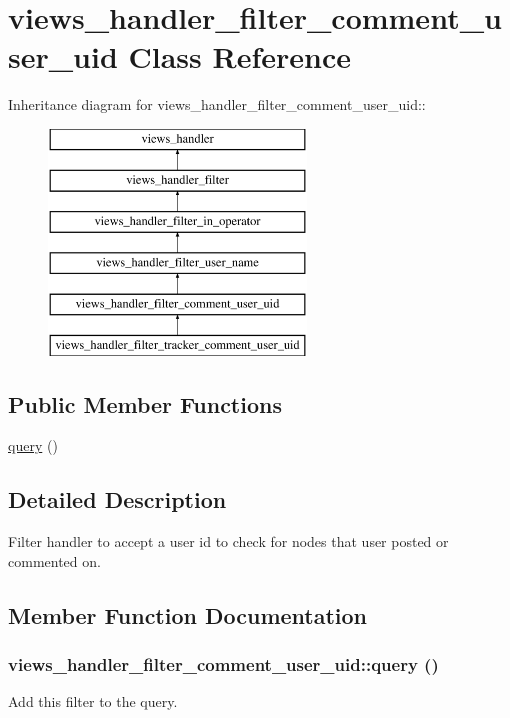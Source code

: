 \hypertarget{classviews__handler__filter__comment__user__uid}{
\section{views\_\-handler\_\-filter\_\-comment\_\-user\_\-uid Class Reference}
\label{classviews__handler__filter__comment__user__uid}
}
Inheritance diagram for views\_\-handler\_\-filter\_\-comment\_\-user\_\-uid::\begin{figure}[H]
\begin{center}
\leavevmode
\includegraphics[height=6cm]{classviews__handler__filter__comment__user__uid}
\end{center}
\end{figure}
\subsection*{Public Member Functions}
\begin{DoxyCompactItemize}
\item 
\hyperlink{classviews__handler__filter__comment__user__uid_a5b649bd04038ac8ed577410ad54ad5b0}{query} ()
\end{DoxyCompactItemize}


\subsection{Detailed Description}
Filter handler to accept a user id to check for nodes that user posted or commented on. 

\subsection{Member Function Documentation}
\hypertarget{classviews__handler__filter__comment__user__uid_a5b649bd04038ac8ed577410ad54ad5b0}{
\subsubsection[{query}]{\setlength{\rightskip}{0pt plus 5cm}views\_\-handler\_\-filter\_\-comment\_\-user\_\-uid::query ()}}
\label{classviews__handler__filter__comment__user__uid_a5b649bd04038ac8ed577410ad54ad5b0}
Add this filter to the query.

